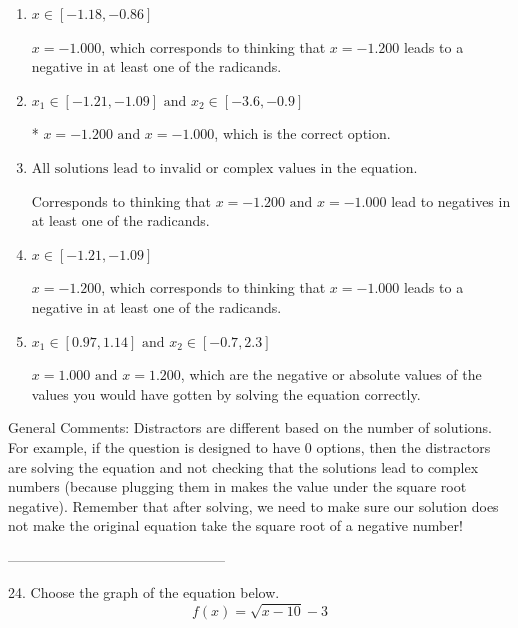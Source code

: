 \documentclass{extbook}[14pt]
\begin{document}
\begin{enumerate}[label=\Alph*.] 
\item $ x \in [-1.18,-0.86] $ 

 $x = -1.000$, which corresponds to thinking that $x = -1.200$ leads to a negative in at least one of the radicands. 
\item $ x_1 \in [-1.21, -1.09] \text{ and } x_2 \in [-3.6,-0.9] $ 

 * $x = -1.200 \text{ and } x = -1.000$, which is the correct option. 
\item $ \text{All solutions lead to invalid or complex values in the equation.} $ 

 Corresponds to thinking that $x = -1.200 \text{ and } x = -1.000$ lead to negatives in at least one of the radicands. 
\item $ x \in [-1.21,-1.09] $ 

 $x = -1.200$, which corresponds to thinking that $x = -1.000$ leads to a negative in at least one of the radicands. 
\item $ x_1 \in [0.97, 1.14] \text{ and } x_2 \in [-0.7,2.3] $ 

 $x = 1.000 \text{ and } x = 1.200$, which are the negative or absolute values of the values you would have gotten by solving the equation correctly. 
\end{enumerate} 
 
General Comments: Distractors are different based on the number of solutions. For example, if the question is designed to have 0 options, then the distractors are solving the equation and not checking that the solutions lead to complex numbers (because plugging them in makes the value under the square root negative). Remember that after solving, we need to make sure our solution does not make the original equation take the square root of a negative number!

-----------------------------------------------

24. Choose the graph of the equation below.
\[ f(x) = \sqrt{x - 10} - 3 \] 
\end{document}
